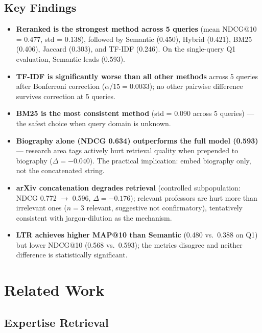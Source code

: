 \documentclass[11pt,a4paper]{article}
\begin{document}
\subsection{Key Findings}

\begin{itemize}[leftmargin=1.5em]
    \item \textbf{Reranked is the strongest method across 5 queries}
    (mean NDCG@10 = 0.477, std = 0.138), followed by Semantic (0.450),
    Hybrid (0.421), BM25 (0.406), Jaccard (0.303), and TF-IDF (0.246).
    On the single-query Q1 evaluation, Semantic leads (0.593).
    \item \textbf{TF-IDF is significantly worse than all other methods}
    across 5 queries after Bonferroni correction ($\alpha/15 = 0.0033$);
    no other pairwise difference survives correction at 5 queries.
    \item \textbf{BM25 is the most consistent method} (std = 0.090 across
    5 queries) --- the safest choice when query domain is unknown.
    \item \textbf{Biography alone (NDCG 0.634) outperforms the full model
    (0.593)} --- research area tags actively hurt retrieval quality when
    prepended to biography ($\Delta = -0.040$). The practical implication:
    embed biography only, not the concatenated string.
    \item \textbf{arXiv concatenation degrades retrieval} (controlled
    subpopulation: NDCG 0.772 $\to$ 0.596, $\Delta = -0.176$); relevant
    professors are hurt more than irrelevant ones ($n=3$ relevant,
    suggestive not confirmatory), tentatively consistent with
    jargon-dilution as the mechanism.
    \item \textbf{LTR achieves higher MAP@10 than Semantic} (0.480 vs.\
    0.388 on Q1) but lower NDCG@10 (0.568 vs.\ 0.593); the metrics
    disagree and neither difference is statistically significant.
\end{itemize}

\section{Related Work}
\label{sec:related}

\subsection{Expertise Retrieval}
\end{document}
